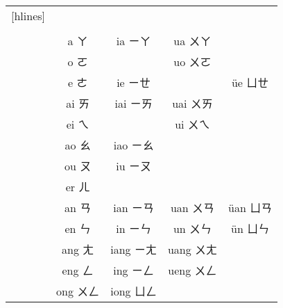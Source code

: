 \begin{table}[H]
    \centering
    \caption{}
    \label{table:韻母表}
    \vspace{.5em}
    \begin{NiceTabular}{>{}c*{4}{c}}[hlines]
        \toprule
         &  &  &  &  \\
        &  &  &  &  \\\midrule[.6pt]
         & a ㄚ & ia ㄧㄚ & ua ㄨㄚ & \\
        & o ㄛ & & uo ㄨㄛ & \\
        & e ㄜ & ie ㄧㄝ & & \"ue ㄩㄝ \\\midrule[.6pt]
         & ai ㄞ & iai ㄧㄞ & uai ㄨㄞ & \\
        & ei ㄟ & & ui ㄨㄟ & \\
        & ao ㄠ & iao ㄧㄠ & & \\
        & ou ㄡ & iu ㄧㄡ & & \\
        & er ㄦ & & & \\\midrule[.6pt]
         & an ㄢ & ian ㄧㄢ & uan ㄨㄢ & \"uan ㄩㄢ \\
        & en ㄣ & in ㄧㄣ & un ㄨㄣ & \"un ㄩㄣ \\
        & ang ㄤ & iang ㄧㄤ & uang ㄨㄤ & \\
        & eng ㄥ & ing ㄧㄥ & ueng ㄨㄥ & \\
        & ong ㄨㄥ & iong ㄩㄥ & & \\\bottomrule
    \end{NiceTabular}
\end{table}
